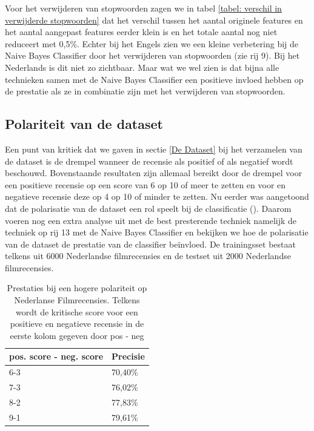 Voor het verwijderen van stopwoorden zagen we in tabel \ref{tabel: verschil in verwijderde stopwoorden} dat het verschil tussen het aantal originele features en het aantal aangepast features eerder klein is en het totale aantal nog niet reduceert met 0,5\%. Echter bij het Engels zien we een kleine verbetering bij de Naive Bayes Classifier door het verwijderen van stopwoorden (zie rij 9). Bij het Nederlands is dit niet zo zichtbaar. Maar wat we wel zien is dat bijna alle technieken samen met de Naive Bayes Classifier een positieve invloed hebben op de prestatie als ze in combinatie zijn met het verwijderen van stopwoorden.\\

\subsection{Polariteit van de dataset}

Een punt van kritiek dat we gaven in sectie \ref{De Dataset} bij het verzamelen van de dataset is de drempel wanneer de recensie als positief of als negatief wordt beschouwd. Bovenstaande resultaten zijn allemaal bereikt door de drempel voor een positieve recensie op een score van 6 op 10 of meer te zetten en voor en negatieve recensie deze op 4 op 10 of minder te zetten.
Nu eerder was aangetoond dat de polarisatie van de dataset een rol speelt bij de classificatie (\cite{maas-EtAl:2011:ACL-HLT2011}). Daarom voeren nog een extra analyse uit met de best presterende techniek namelijk de techniek op rij 13 met de Naive Bayes Classifier en bekijken we hoe de polarisatie van de dataset de prestatie van de classifier be\"invloed. De trainingsset bestaat telkens uit 6000 Nederlandse filmrecensies en de testset uit 2000 Nederlandse filmrecensies.


\begin{table}[H]
\centering
\begin{tabular}{|l|l|}
\hline
\cline{2-2}
pos. score - neg. score    & Precisie \\ \hline
\multicolumn{1}{|l|}{6-3} & 70,40\%  \\ \hline
\multicolumn{1}{|l|}{7-3} & 76,02\%  \\ \hline
\multicolumn{1}{|l|}{8-2} & 77,83\%  \\ \hline
\multicolumn{1}{|l|}{9-1} & 79,61\%  \\ \hline
\end{tabular}
\caption{Prestaties bij een hogere polariteit op Nederlanse Filmrecensies. Telkens wordt de kritische score voor een positieve en negatieve recensie in de eerste kolom gegeven door pos - neg  }
\end{table}
 
